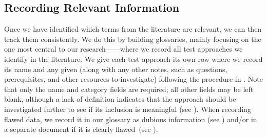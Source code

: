 
\subsection{Recording Relevant Information}\label{record-info}

\ifnotpaper
    
\fi

Once we have identified which terms from the literature are relevant, we can
then track them consistently. We do this by building glossaries, mainly
focusing on the one most central to our research---\ourApproachGlossary{}---where
we record all test approaches we identify in the literature. We give each test
approach its own row where we record its name and any given \approachFields*{}
(along with any other notes, such as questions, prerequisites, and other
resources to investigate) following the procedure in .
Note that only the name and category fields are required; all other fields
may be left blank, although a lack of definition indicates that the approach
should be investigated further to see if its inclusion is meaningful (see
). When recording flawed data, we record it in our glossary
as dubious information (see ) and/or in a separate
document if it is clearly flawed\ifnotpaper\ (see )\fi.


